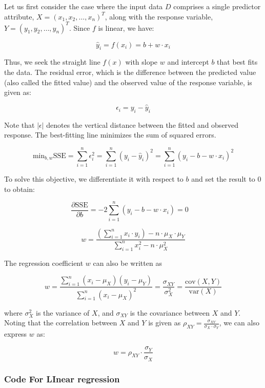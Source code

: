\documentclass[a4paper,conference]{IEEEtran}
\begin{document}
Let us first consider the case where the input data \(D\) comprises a
single predictor attribute, \(X = (x_1, x_2, \ldots, x_n)^T\), along
with the response variable, \(Y = (y_1, y_2, \ldots, y_n)^T\). Since
\(f\) is linear, we have:

\[
\hat{y}_i = f(x_i) = b + w \cdot x_i
\]

Thus, we seek the straight line \(f(x)\) with slope \(w\) and intercept
\(b\) that best fits the data. The residual error, which is the
difference between the predicted value (also called the fitted value)
and the observed value of the response variable, is given as:

\[ 
\epsilon_i = y_i - \hat{y}_i 
\]

Note that \(|\epsilon|\) denotes the vertical distance between the
fitted and observed response. The best-fitting line minimizes the sum of
squared errors.

\[ 
\text{min}_{b, w} \text{SSE} = \sum_{i=1}^{n} \epsilon_i^2 = \sum_{i=1}^{n} (y_i - \hat{y}_i)^2 = \sum_{i=1}^{n} (y_i - b - w \cdot x_i)^2 
\]

To solve this objective, we differentiate it with respect to \(b\) and
set the result to 0 to obtain:

\[ 
\frac{\partial \text{SSE}}{\partial b} = -2 \sum_{i=1}^{n} (y_i - b - w \cdot x_i) = 0 \quad  
\]

\[ 
w = \frac{(\sum_{i=1}^{n} x_i \cdot y_i) - n \cdot \mu_X \cdot \mu_Y}{\sum_{i=1}^{n} x_i^2 - n \cdot \mu^2_X} 
\]

The regression coefficient \(w\) can also be written as

\[ w = \frac{\sum_{i=1}^{n} (x_i - \mu_X)(y_i - \mu_Y)}{\sum_{i=1}^{n} (x_i - \mu_X)^2} = \frac{\sigma_{XY}}{\sigma_X^2} = \frac{\text{cov}(X, Y)}{\text{var}(X)} 
\]

where \(\sigma_X^2\) is the variance of \(X\), and \(\sigma_{XY}\) is
the covariance between \(X\) and \(Y\). Noting that the correlation
between \(X\) and \(Y\) is given as
\(\rho_{XY} = \frac{\sigma_{XY}}{\sigma_X \cdot \sigma_Y}\), we can also
express \(w\) as:

\[
w = \rho_{XY} \cdot \frac{\sigma_Y}{\sigma_X} 
\]

\hypertarget{sec:code-for-linear-regression}{%
\subsubsection{Code For LInear
regression}\label{sec:code-for-linear-regression}}
\end{document}
